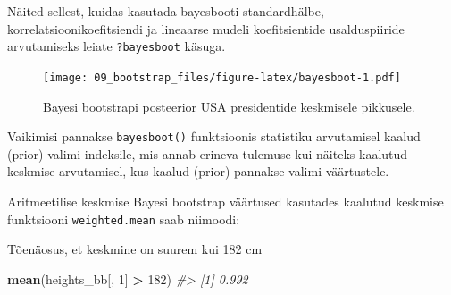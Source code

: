 \documentclass[]{book}
\newenvironment{Shaded}{\begin{snugshade}}{\end{snugshade}}
\newcommand{\CommentTok}[1]{\textcolor[rgb]{0.56,0.35,0.01}{\textit{#1}}}
\newcommand{\DataTypeTok}[1]{\textcolor[rgb]{0.13,0.29,0.53}{#1}}
\newcommand{\DecValTok}[1]{\textcolor[rgb]{0.00,0.00,0.81}{#1}}
\newcommand{\FloatTok}[1]{\textcolor[rgb]{0.00,0.00,0.81}{#1}}
\newcommand{\KeywordTok}[1]{\textcolor[rgb]{0.13,0.29,0.53}{\textbf{#1}}}
\newcommand{\NormalTok}[1]{#1}
\newcommand{\OperatorTok}[1]{\textcolor[rgb]{0.81,0.36,0.00}{\textbf{#1}}}
\newcommand{\OtherTok}[1]{\textcolor[rgb]{0.56,0.35,0.01}{#1}}
\newcommand{\StringTok}[1]{\textcolor[rgb]{0.31,0.60,0.02}{#1}}
\begin{document}
Näited sellest, kuidas kasutada bayesbooti standardhälbe, korrelatsioonikoefitsiendi ja lineaarse mudeli koefitsientide usalduspiiride arvutamiseks leiate \texttt{?bayesboot} käsuga.



\begin{Shaded}
\end{Shaded}

\begin{figure}
\centering
\texttt{[image: 09\_bootstrap\_files/figure-latex/bayesboot-1.pdf]}
\caption{\label{fig:bayesboot}Bayesi bootstrapi posteerior USA presidentide keskmisele pikkusele.}
\end{figure}

\begin{Shaded}
\end{Shaded}

Vaikimisi pannakse \texttt{bayesboot()} funktsioonis statistiku arvutamisel kaalud (prior) valimi indeksile, mis annab erineva tulemuse kui näiteks kaalutud keskmise arvutamisel, kus kaalud (prior) pannakse valimi väärtustele.

Aritmeetilise keskmise Bayesi bootstrap väärtused kasutades kaalutud keskmise funktsiooni \texttt{weighted.mean} saab niimoodi:

\begin{Shaded}
\end{Shaded}

Tõenäosus, et keskmine on suurem kui 182 cm

\begin{Shaded}
\begin{Highlighting}[]
\KeywordTok{mean}\NormalTok{(heights_bb[, }\DecValTok{1}\NormalTok{] }\OperatorTok{>}\StringTok{ }\DecValTok{182}\NormalTok{)}
\CommentTok{#> [1] 0.992}
\end{Highlighting}
\end{Shaded}
\end{document}
